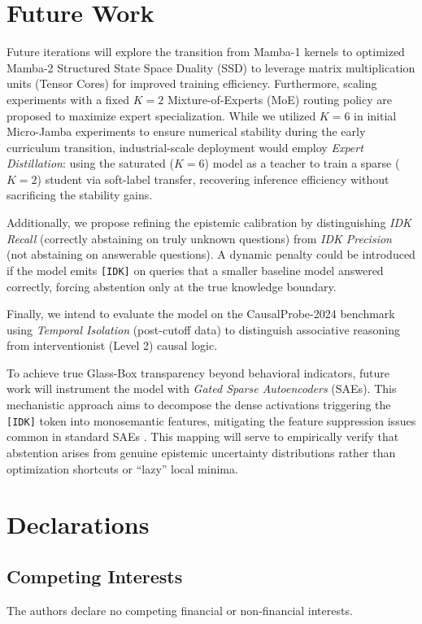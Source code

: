 \documentclass[12pt, a4paper]{article}
\begin{document}
\section{Future Work}
Future iterations will explore the transition from Mamba-1 kernels to optimized Mamba-2 Structured State Space Duality (SSD) \cite{Dao2024Mamba2} to leverage matrix multiplication units (Tensor Cores) for improved training efficiency. Furthermore, scaling experiments with a fixed $K=2$ Mixture-of-Experts (MoE) routing policy are proposed to maximize expert specialization. While we utilized $K=6$ in initial Micro-Jamba experiments to ensure numerical stability during the early curriculum transition, industrial-scale deployment would employ \textit{Expert Distillation}: using the saturated ($K=6$) model as a teacher to train a sparse ($K=2$) student via soft-label transfer, recovering inference efficiency without sacrificing the stability gains.

Additionally, we propose refining the epistemic calibration by distinguishing \textit{IDK Recall} (correctly abstaining on truly unknown questions) from \textit{IDK Precision} (not abstaining on answerable questions). A dynamic penalty could be introduced if the model emits \texttt{[IDK]} on queries that a smaller baseline model answered correctly, forcing abstention only at the true knowledge boundary.

Finally, we intend to evaluate the model on the CausalProbe-2024 benchmark using \textit{Temporal Isolation} (post-cutoff data) to distinguish associative reasoning from interventionist (Level 2) causal logic.

To achieve true Glass-Box transparency beyond behavioral indicators, future work will instrument the model with \textit{Gated Sparse Autoencoders} (SAEs). This mechanistic approach aims to decompose the dense activations triggering the \texttt{[IDK]} token into monosemantic features, mitigating the feature suppression issues common in standard SAEs \cite{Anthropic2024SAE}. This mapping will serve to empirically verify that abstention arises from genuine epistemic uncertainty distributions rather than optimization shortcuts or ``lazy'' local minima.


\section*{Declarations}

\subsection*{Competing Interests}
The authors declare no competing financial or non-financial interests.
\end{document}
